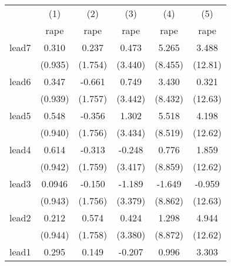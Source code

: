 {
\def\sym#1{\ifmmode^{#1}\else\(^{#1}\)\fi}
\begin{tabular}{l*{5}{c}}
\hline\hline
            &\multicolumn{1}{c}{(1)}&\multicolumn{1}{c}{(2)}&\multicolumn{1}{c}{(3)}&\multicolumn{1}{c}{(4)}&\multicolumn{1}{c}{(5)}\\
            &\multicolumn{1}{c}{rape}&\multicolumn{1}{c}{rape}&\multicolumn{1}{c}{rape}&\multicolumn{1}{c}{rape}&\multicolumn{1}{c}{rape}\\
\hline
lead7       &       0.310         &       0.237         &       0.473         &       5.265         &       3.488         \\
            &     (0.935)         &     (1.754)         &     (3.440)         &     (8.455)         &     (12.81)         \\
[1em]
lead6       &       0.347         &      -0.661         &       0.749         &       3.430         &       0.321         \\
            &     (0.939)         &     (1.757)         &     (3.442)         &     (8.432)         &     (12.63)         \\
[1em]
lead5       &       0.548         &      -0.356         &       1.302         &       5.518         &       4.198         \\
            &     (0.940)         &     (1.756)         &     (3.434)         &     (8.519)         &     (12.62)         \\
[1em]
lead4       &       0.614         &      -0.313         &      -0.248         &       0.776         &       1.859         \\
            &     (0.942)         &     (1.759)         &     (3.417)         &     (8.859)         &     (12.62)         \\
[1em]
lead3       &      0.0946         &      -0.150         &      -1.189         &      -1.649         &      -0.959         \\
            &     (0.943)         &     (1.756)         &     (3.379)         &     (8.862)         &     (12.63)         \\
[1em]
lead2       &       0.212         &       0.574         &       0.424         &       1.298         &       4.944         \\
            &     (0.944)         &     (1.758)         &     (3.380)         &     (8.872)         &     (12.62)         \\
[1em]
lead1       &       0.295         &       0.149         &      -0.207         &       0.996         &       3.303         \\

\end{tabular}}
